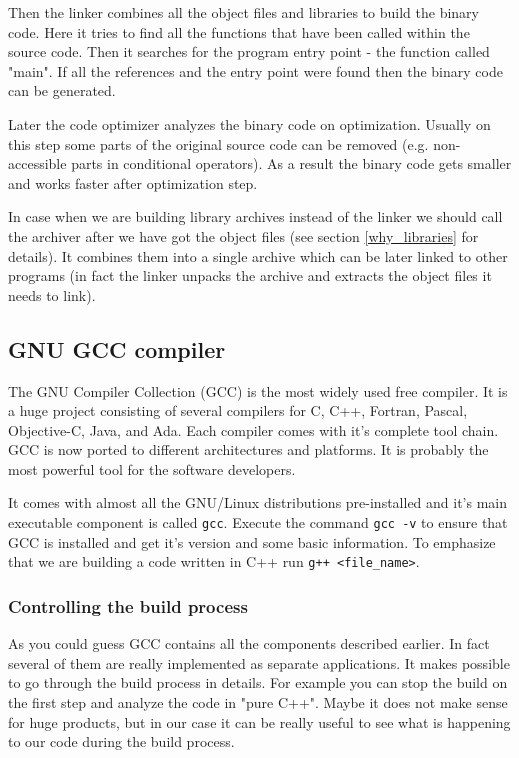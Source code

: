 Then the linker combines all the object files and libraries to build the binary code. Here it tries to find all the functions that have been called within the source code. Then it searches for the program entry point - the function called "main". If all the references and the entry point were found then the binary code can be generated.

Later the code optimizer analyzes the binary code on optimization. Usually on this step some parts of the original source code can be removed (e.g. non-accessible parts in conditional operators). As a result the binary code gets smaller and works faster after optimization step.

In case when we are building library archives instead of the linker we should call the archiver after we have got the object files (see section \ref{why_libraries} for details). It combines them into a single archive which can be later linked to other programs (in fact the linker unpacks the archive and extracts the object files it needs to link).

\subsection{GNU GCC compiler}
The GNU Compiler Collection (GCC) is the most widely used free compiler. It is a huge project consisting of several compilers for C, C++, Fortran, Pascal, Objective-C, Java, and Ada. Each compiler comes with it's complete tool chain. GCC is now ported to different architectures and platforms. It is probably the most powerful tool for the software developers.

It comes with almost all the GNU/Linux distributions pre-installed and it's main executable component is called {\tt gcc}. Execute the command {\tt gcc -v} to ensure that GCC is installed and get it's version and some basic information. To emphasize that we are building a code written in C++ run {\tt g++ <file\_name>}.

\subsubsection{Controlling the build process}
As you could guess GCC contains all the components described earlier. In fact several of them are really implemented as separate applications. It makes possible to go through the build process in details. For example you can stop the build on the first step and analyze the code in "pure C++". Maybe it does not make sense for huge products, but in our case it can be really useful to see what is happening to our code during the build process.

